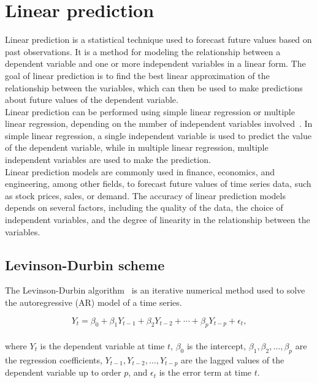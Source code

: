     \section{Linear prediction} \label{sec:lp}
    Linear prediction is a statistical technique used to forecast future values based on past observations. It is a method for modeling the
    relationship between a dependent variable and one or more independent variables in a linear form. The goal of linear prediction is to find
    the best linear approximation of the relationship between the variables, which can then be used to make predictions about future values of
    the dependent variable.
    \\
    Linear prediction can be performed using simple linear regression or multiple linear regression, depending on the number of independent variables
    involved~\cite{Parks}. In simple linear regression, a single independent variable is used to predict the value of the dependent variable,
    while in multiple linear
    regression, multiple independent variables are used to make the prediction.
    \\
    Linear prediction models are commonly used in finance, economics, and engineering, among other fields, to forecast future values of time series data,
    such as stock prices, sales, or demand. The accuracy of linear prediction models depends on several factors, including the quality of the data,
    the choice of independent variables, and the degree of linearity in the relationship between the variables.

    \subsection{Levinson-Durbin scheme} \label{subsec:levinson}

    The Levinson-Durbin algorithm~\cite{Levinson} is an iterative numerical method used to solve the autoregressive (AR) model of a time series.

    \begin{equation} \label{eq:levinson}
        Y_t = \beta_0 + \beta_1 Y_{t-1} + \beta_2 Y_{t-2} + \cdots + \beta_p Y_{t-p} + \epsilon_t,
    \end{equation}
    \\
    where $Y_t$ is the dependent variable at time $t$, $\beta_0$ is the intercept, $\beta_1, \beta_2, \dots, \beta_p$ are the
    regression coefficients, $Y_{t-1}, Y_{t-2}, \dots, Y_{t-p}$ are the lagged values of the dependent variable up to order $p$, and $\epsilon_t$ is
    the error term at time $t$.

